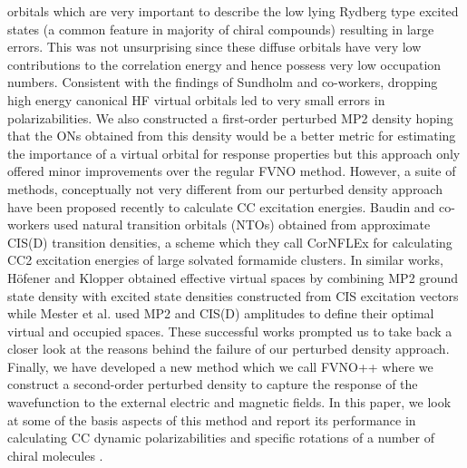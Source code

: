 orbitals which are very important to describe the low lying Rydberg type 
excited states (a common feature in majority of chiral compounds) 
resulting in large errors. This was not unsurprising since these diffuse 
orbitals have very low contributions to the correlation energy and hence 
possess very low occupation numbers. Consistent with the findings of Sundholm 
and co-workers\cite{Sundholm13}, dropping high energy canonical HF 
virtual orbitals led to very small errors in polarizabilities. 
We also constructed a first-order perturbed MP2 density hoping that 
the ONs obtained from this density would be a better metric for 
estimating the importance of a virtual orbital 
for response properties but this approach only offered
minor improvements over the regular FVNO method. However, 
a suite of methods, conceptually not very different from our 
perturbed density approach have been proposed recently 
to calculate CC excitation energies. Baudin and co-workers 
used natural transition orbitals (NTOs) obtained from approximate 
CIS(D) transition densities, a scheme which they call CorNFLEx for 
calculating CC2 excitation energies of large solvated formamide 
clusters\cite{}. In similar works, H{\"o}fener and Klopper 
obtained effective virtual spaces by combining MP2 
ground state density with excited state densities constructed from CIS 
excitation vectors\cite{} while Mester et al. used MP2 and CIS(D) amplitudes 
to define their optimal virtual and occupied spaces\cite{Mester17,Mester18}.
These successful works prompted us to take back a closer look at the 
reasons behind the failure of our perturbed density approach. 
Finally, we have developed a new method which we call FVNO++ 
where we construct a second-order perturbed density to 
capture the response of the wavefunction to the external electric 
and magnetic fields. In this paper, we look at some of the basis aspects of 
this method and report its performance in calculating CC dynamic 
polarizabilities and specific rotations of a number of chiral molecules .
